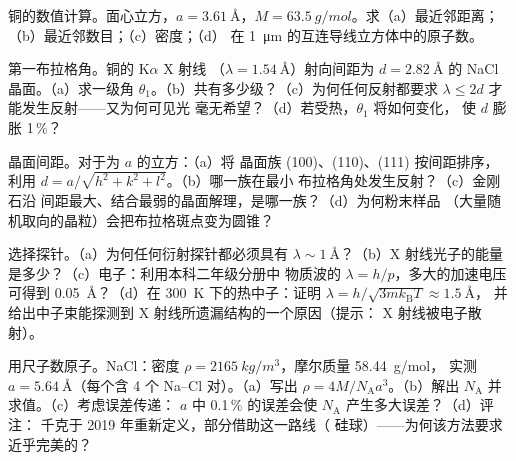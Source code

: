 \begin{exercise}[$\star$]\label{exo:b3:crystalline-solids:2}
铜的数值计算。面心立方，$a = \qty{3.61}{\angstrom}$，$M =
\qty{63.5}{g/mol}$。求（a）最近邻距离；
（b）最近邻数目；（c）密度；（d）
在 \qty{1}{\micro m} 的互连导线立方体中的原子数。
\end{exercise}

\begin{exercise}[$\star$]\label{exo:b3:crystalline-solids:3}
第一布拉格角。铜的 K$\alpha$ X 射线
（$\lambda = \qty{1.54}{\angstrom}$）射向间距为
$d = \qty{2.82}{\angstrom}$ 的 NaCl 晶面。（a）求一级角
$\theta_1$。（b）共有多少级？（c）为何任何反射都要求
$\lambda \le 2d$ 才能发生反射——又为何可见光
毫无希望？（d）若受热，$\theta_1$ 将如何变化，
使 $d$ 膨胀 1\,\%？
\end{exercise}

\begin{exercise}[$\star$]\label{exo:b3:crystalline-solids:4}
晶面间距。对于为 $a$ 的立方：（a）将
晶面族 (100)、(110)、(111) 按间距排序，利用
$d = a/\sqrt{h^2+k^2+l^2}$。（b）哪一族在最小
布拉格角处发生反射？（c）金刚石沿
间距最大、结合最弱的晶面解理，是哪一族？（d）为何粉末样品
（大量随机取向的晶粒）会把布拉格斑点变为圆锥？
\end{exercise}

\begin{exercise}[$\star\star$]\label{exo:b3:crystalline-solids:5}
选择探针。（a）为何任何衍射探针都必须具有
$\lambda \sim \qty{1}{\angstrom}$？（b）X 射线光子的能量
是多少？（c）电子：利用本科二年级分册中
物质波的 $\lambda = h/p$，多大的加速电压可得到
\qty{0.05}{\angstrom}？（d）在 \qty{300}{K} 下的热中子：证明
$\lambda = h/\sqrt{3mk_{\text{B}}T} \approx \qty{1.5}{\angstrom}$，
并给出中子束能探测到 X 射线所遗漏结构的一个原因（提示：
X 射线被电子散射）。
\end{exercise}

\begin{exercise}[$\star\star$]\label{exo:b3:crystalline-solids:6}
用尺子数原子。NaCl：密度
$\rho = \qty{2165}{kg/m^3}$，摩尔质量 \qty{58.44}{g/mol}，
实测 $a = \qty{5.64}{\angstrom}$（每个含 4 个 Na--Cl
对）。（a）写出 $\rho = 4M/N_{\text{A}}a^3$。（b）解出
$N_{\text{A}}$ 并求值。（c）考虑误差传递：
$a$ 中 0.1\,\% 的误差会使 $N_{\text{A}}$ 产生多大误差？（d）评注：
千克于 2019 年重新定义，部分借助这一路线（
硅球）——为何该方法要求近乎完美的？
\end{exercise}

